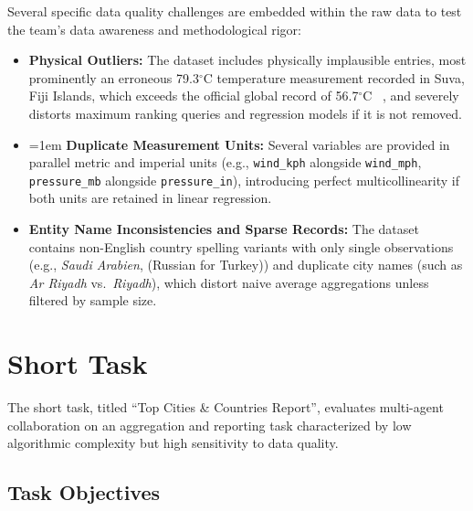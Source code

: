 Several specific data quality challenges are embedded within the raw data to test the team's data awareness and methodological rigor:
\begin{itemize}
    \item \textbf{Physical Outliers:} The dataset includes physically implausible entries, most prominently an erroneous 79.3$^\circ$C temperature measurement recorded in Suva, Fiji Islands, which exceeds the official global record of 56.7$^\circ$C ~\cite{world_record_temp}, and severely distorts maximum ranking queries and regression models if it is not removed.
    \item {
    \emergencystretch=1em
    \textbf{Duplicate Measurement Units:} Several variables are provided in parallel metric and imperial units (e.g., \texttt{wind\_kph} alongside \texttt{wind\_mph}, \texttt{pressure\_mb} alongside \texttt{pressure\_in}), introducing perfect multicollinearity if both units are retained in linear regression.\par}
    \item \textbf{Entity Name Inconsistencies and Sparse Records:} The dataset contains non-English country spelling variants with only single observations (e.g., \textit{Saudi Arabien}, \textit{} (Russian for Turkey)) and duplicate city names (such as \textit{Ar Riyadh} vs.\ \textit{Riyadh}), which distort naive average aggregations unless filtered by sample size.
\end{itemize}

\section{Short Task}
\label{sec:short-task}

The short task, titled ``Top Cities \& Countries Report'', evaluates multi-agent collaboration on an aggregation and reporting task characterized by low algorithmic complexity but high sensitivity to data quality.

\subsection{Task Objectives}
\label{subsec:short-task-objectives}

